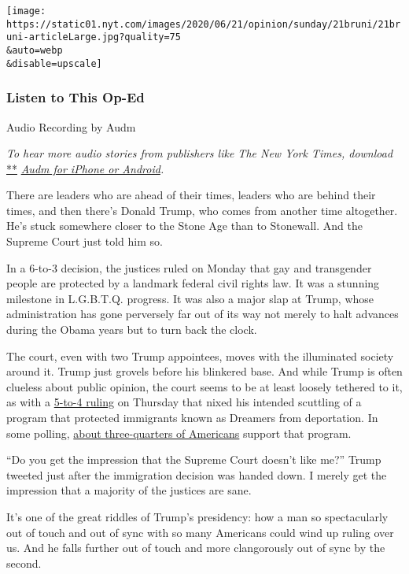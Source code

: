 \texttt{[image: https://static01.nyt.com/images/2020/06/21/opinion/sunday/21bruni/21bruni-articleLarge.jpg?quality=75\\\&auto=webp\\\&disable=upscale]}

\hypertarget{listen-to-this-op-ed}{%
\subsubsection{Listen to This Op-Ed}\label{listen-to-this-op-ed}}

Audio Recording by Audm

\emph{To hear more audio stories from publishers like The New York
Times, download}
\href{https://www.audm.com/?utm_source=nytmag\&utm_medium=embed\&utm_campaign=left_behind_draper}{**}
\href{https://www.audm.com/?utm_source=nyto\&utm_medium=embed\&utm_campaign=trump_the_troglodyte}{\emph{Audm
for iPhone or Android}}\emph{.}

There are leaders who are ahead of their times, leaders who are behind
their times, and then there's Donald Trump, who comes from another time
altogether. He's stuck somewhere closer to the Stone Age than to
Stonewall. And the Supreme Court just told him so.

In a 6-to-3 decision, the justices ruled on Monday that gay and
transgender people are protected by a landmark federal civil rights law.
It was a stunning milestone in L.G.B.T.Q. progress. It was also a major
slap at Trump, whose administration has gone perversely far out of its
way not merely to halt advances during the Obama years but to turn back
the clock.

The court, even with two Trump appointees, moves with the illuminated
society around it. Trump just grovels before his blinkered base. And
while Trump is often clueless about public opinion, the court seems to
be at least loosely tethered to it, as with a
\href{https://www.nytimes.com/2020/06/18/us/trump-daca-supreme-court.html}{5-to-4
ruling} on Thursday that nixed his intended scuttling of a program that
protected immigrants known as Dreamers from deportation. In some
polling,
\href{https://www.politico.com/f/?id=00000172-bfcc-d721-adff-bffc571e0000}{about
three-quarters of Americans} support that program.

``Do you get the impression that the Supreme Court doesn't like me?''
Trump tweeted just after the immigration decision was handed down. I
merely get the impression that a majority of the justices are sane.

It's one of the great riddles of Trump's presidency: how a man so
spectacularly out of touch and out of sync with so many Americans could
wind up ruling over us. And he falls further out of touch and more
clangorously out of sync by the second.

